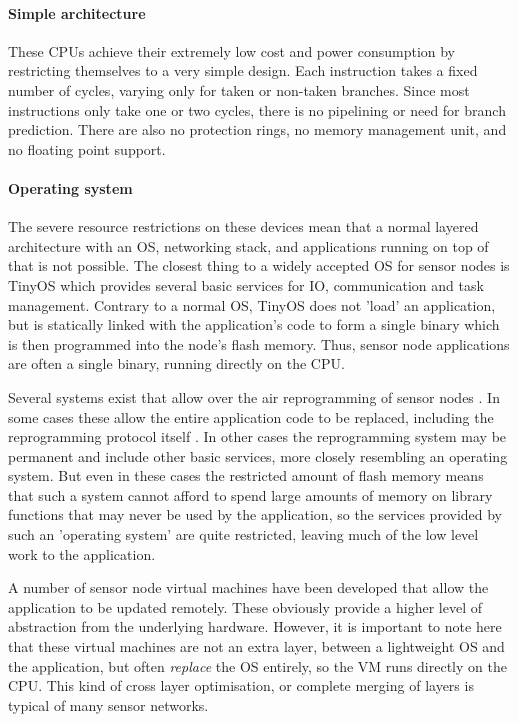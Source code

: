 \paragraph{Simple architecture}
These CPUs achieve their extremely low cost and power consumption by restricting themselves to a very simple design. Each instruction takes a fixed number of cycles, varying only for taken or non-taken branches. Since most instructions only take one or two cycles, there is no pipelining or need for branch prediction. There are also no protection rings, no memory management unit, and no floating point support.

\paragraph{Operating system}
The severe resource restrictions on these devices mean that a normal layered architecture with an OS, networking stack, and applications running on top of that is not possible. The closest thing to a widely accepted OS for sensor nodes is TinyOS \cite{Levis:2004ws} which provides several basic services for IO, communication and task management. Contrary to a normal OS, TinyOS does not 'load' an application, but is statically linked with the application's code to form a single binary which is then programmed into the node's flash memory. Thus, sensor node applications are often a single binary, running directly on the CPU.

Several systems exist that allow over the air reprogramming of sensor nodes \cite{Quadri:2014wr}. In some cases these allow the entire application code to be replaced, including the reprogramming protocol itself \cite{Reijers:2003ww}. In other cases the reprogramming system may be permanent and include other basic services, more closely resembling an operating system. But even in these cases the restricted amount of flash memory means that such a system cannot afford to spend large amounts of memory on library functions that may never be used by the application, so the services provided by such an 'operating system' are quite restricted, leaving much of the low level work to the application.

A number of sensor node virtual machines have been developed that allow the application to be updated remotely. These obviously provide a higher level of abstraction from the underlying hardware. However, it is important to note here that these virtual machines are not an extra layer, between a lightweight OS and the application, but often \emph{replace} the OS entirely, so the VM runs directly on the CPU. This kind of cross layer optimisation, or complete merging of layers is typical of many sensor networks.

